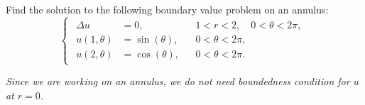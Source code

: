 \documentclass[plain]{pset}
\begin{document}
\pagebreak

\begin{problem}
Find the solution to the following boundary value problem on an annulus:
\[
    \begin{cases}
        \begin{aligned}
            \Delta u     & = 0,            &  & 1 < r < 2, \quad 0 < \theta < 2\pi, \\
            u(1, \theta) & = \sin(\theta), &  & 0 < \theta < 2\pi,                  \\
            u(2, \theta) & = \cos(\theta), &  & 0 < \theta < 2\pi.
        \end{aligned}
    \end{cases}
\]
\begin{hint}
    \emph{Since we are working on an annulus, we do not need boundedness condition for \(u\) at \(r = 0\).}
\end{hint}
\end{problem}
\end{document}

